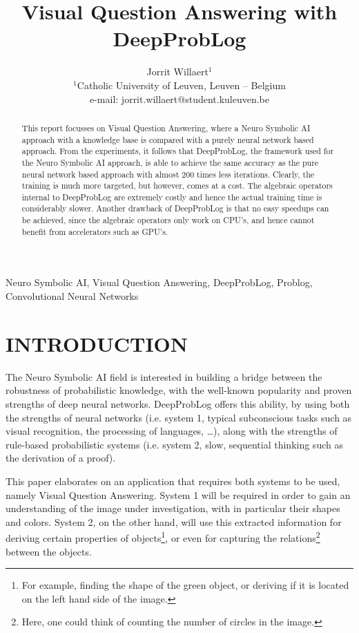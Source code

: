 \documentclass[english]{sobraep}
\title{Visual Question Answering with DeepProbLog}
\author{Jorrit Willaert$^{1}$ \\
	\normalsize $^{1}$Catholic University of Leuven, Leuven -- Belgium \\
	\normalsize e-mail: jorrit.willaert@student.kuleuven.be
}
\begin{document}
\maketitle

\begin{abstract}
	This report focusses on Visual Question Answering, where a Neuro Symbolic AI approach with a knowledge base is compared with a purely neural network based approach. From the experiments, it follows that DeepProbLog, the framework used for the Neuro Symbolic AI approach, is able to achieve the same accuracy as the pure neural network based approach with almost 200 times less iterations. Clearly, the training is much more targeted, but however, comes at a cost. The algebraic operators internal to DeepProbLog are extremely costly and hence the actual training time is considerably slower. Another drawback of DeepProbLog is that no easy speedups can be achieved, since the algebraic operators only work on CPU's, and hence cannot benefit from accelerators such as GPU's.
\end{abstract}

\begin{keywords}
	Neuro Symbolic AI, Visual Question Answering, DeepProbLog, Problog, Convolutional Neural Networks
\end{keywords}

\section{INTRODUCTION}
The Neuro Symbolic AI field is interested in building a bridge between the robustness of probabilistic knowledge, with the well-known popularity and proven strengths of deep neural networks. DeepProbLog \cite{deepproblog} offers this ability, by using both the strengths of neural networks (i.e. system 1, typical subconscious tasks such as visual recognition, the processing of languages, \dots), along with the strengths of rule-based probabilistic systems (i.e. system 2, slow, sequential thinking such as the derivation of a proof). 

This paper elaborates on an application that requires both systems to be used, namely Visual Question Answering. System 1 will be required in order to gain an understanding of the image under investigation, with in particular their shapes and colors. System 2, on the other hand, will use this extracted information for deriving certain properties of objects\footnote{For example, finding the shape of the green object, or deriving if it is located on the left hand side of the image.}, or even for capturing the relations\footnote{Here, one could think of counting the number of circles in the image.} between the objects. 
\end{document}
